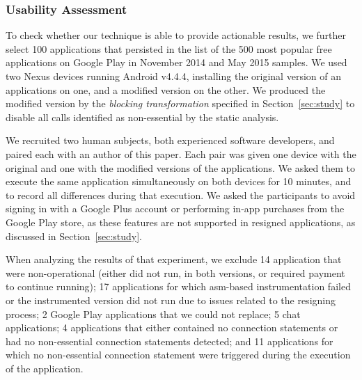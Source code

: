 
\subsubsection{Usability Assessment}
To check whether our technique is able to provide actionable results, we further select 100 applications that persisted in the list of the 500 most popular free applications on Google Play in November 2014 and May 2015 samples. 
We used two Nexus devices running Android v4.4.4, installing the original version of an applications on one, and a modified version on the other. We produced the modified version by the \emph{blocking transformation} specified in Section~\ref{sec:study} to disable all calls identified as non-essential by the static analysis. 

We recruited two human subjects, both experienced software developers, and paired each with an author of this paper.
Each pair was given one device with the original and one with the modified versions of the applications. We asked them to execute the same application simultaneously on both devices for 10 minutes, and to record all differences during that execution.
We asked the participants to avoid signing in with a Google Plus account or performing in-app purchases from the Google Play store, as these features are not supported in resigned applications, as discussed in Section~\ref{sec:study}.

When analyzing the results of that experiment, we exclude 14 application that were non-operational (either did not run, in both versions, or required payment to continue running);
 17 applications for which asm-based instrumentation failed or the instrumented version did not run due to issues related to the resigning process;
 2 Google Play applications that we could not replace;
5 chat applications;
4 applications that either contained no connection statements or had no non-essential connection statements detected;
and 11 applications for which no non-essential connection statement were triggered during the execution of the application.

